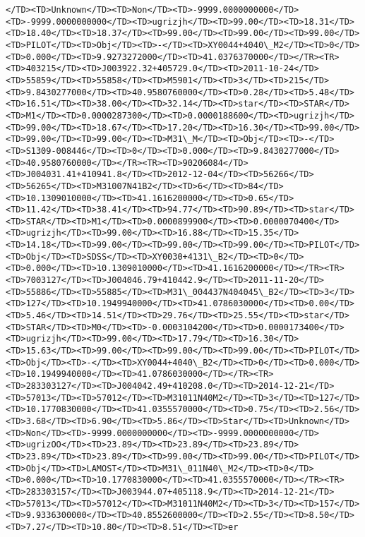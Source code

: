\documentclass[11pt]{article}
\begin{document}
\begin{Verbatim}[commandchars=\\\{\}]
</TD><TD>Unknown</TD><TD>Non</TD><TD>-9999.0000000000</TD><TD>-9999.0000000000</TD><TD>ugrizjh</TD><TD>99.00</TD><TD>18.31</TD><TD>18.40</TD><TD>18.37</TD><TD>99.00</TD><TD>99.00</TD><TD>99.00</TD><TD>PILOT</TD><TD>Obj</TD><TD>-</TD><TD>XY0044+4040\_M2</TD><TD>0</TD><TD>0.000</TD><TD>9.9273272000</TD><TD>41.0376370000</TD></TR><TR><TD>403215</TD><TD>J003922.32+405729.0</TD><TD>2011-10-24</TD><TD>55859</TD><TD>55858</TD><TD>M5901</TD><TD>3</TD><TD>215</TD><TD>9.8430277000</TD><TD>40.9580760000</TD><TD>0.28</TD><TD>5.48</TD><TD>16.51</TD><TD>38.00</TD><TD>32.14</TD><TD>star</TD><TD>STAR</TD><TD>M1</TD><TD>0.0000287300</TD><TD>0.0000188600</TD><TD>ugrizjh</TD><TD>99.00</TD><TD>18.67</TD><TD>17.20</TD><TD>16.30</TD><TD>99.00</TD><TD>99.00</TD><TD>99.00</TD><TD>M31\_M</TD><TD>Obj</TD><TD>-</TD><TD>S1309-008446</TD><TD>0</TD><TD>0.000</TD><TD>9.8430277000</TD><TD>40.9580760000</TD></TR><TR><TD>90206084</TD><TD>J004031.41+410941.8</TD><TD>2012-12-04</TD><TD>56266</TD><TD>56265</TD><TD>M31007N41B2</TD><TD>6</TD><TD>84</TD><TD>10.1309010000</TD><TD>41.1616200000</TD><TD>0.65</TD><TD>11.42</TD><TD>38.41</TD><TD>94.77</TD><TD>90.89</TD><TD>star</TD><TD>STAR</TD><TD>M1</TD><TD>0.0000899900</TD><TD>0.0000070400</TD><TD>ugrizjh</TD><TD>99.00</TD><TD>16.88</TD><TD>15.35</TD><TD>14.18</TD><TD>99.00</TD><TD>99.00</TD><TD>99.00</TD><TD>PILOT</TD><TD>Obj</TD><TD>SDSS</TD><TD>XY0030+4131\_B2</TD><TD>0</TD><TD>0.000</TD><TD>10.1309010000</TD><TD>41.1616200000</TD></TR><TR><TD>7003127</TD><TD>J004046.79+410442.9</TD><TD>2011-11-20</TD><TD>55886</TD><TD>55885</TD><TD>M31\_004437N404045\_B2</TD><TD>3</TD><TD>127</TD><TD>10.1949940000</TD><TD>41.0786030000</TD><TD>0.00</TD><TD>5.46</TD><TD>14.51</TD><TD>29.76</TD><TD>25.55</TD><TD>star</TD><TD>STAR</TD><TD>M0</TD><TD>-0.0003104200</TD><TD>0.0000173400</TD><TD>ugrizjh</TD><TD>99.00</TD><TD>17.79</TD><TD>16.30</TD><TD>15.63</TD><TD>99.00</TD><TD>99.00</TD><TD>99.00</TD><TD>PILOT</TD><TD>Obj</TD><TD>-</TD><TD>XY0044+4040\_B2</TD><TD>0</TD><TD>0.000</TD><TD>10.1949940000</TD><TD>41.0786030000</TD></TR><TR><TD>283303127</TD><TD>J004042.49+410208.0</TD><TD>2014-12-21</TD><TD>57013</TD><TD>57012</TD><TD>M31011N40M2</TD><TD>3</TD><TD>127</TD><TD>10.1770830000</TD><TD>41.0355570000</TD><TD>0.75</TD><TD>2.56</TD><TD>3.68</TD><TD>6.90</TD><TD>5.86</TD><TD>Star</TD><TD>Unknown</TD><TD>Non</TD><TD>-9999.0000000000</TD><TD>-9999.0000000000</TD><TD>ugrizOO</TD><TD>23.89</TD><TD>23.89</TD><TD>23.89</TD><TD>23.89</TD><TD>23.89</TD><TD>99.00</TD><TD>99.00</TD><TD>PILOT</TD><TD>Obj</TD><TD>LAMOST</TD><TD>M31\_011N40\_M2</TD><TD>0</TD><TD>0.000</TD><TD>10.1770830000</TD><TD>41.0355570000</TD></TR><TR><TD>283303157</TD><TD>J003944.07+405118.9</TD><TD>2014-12-21</TD><TD>57013</TD><TD>57012</TD><TD>M31011N40M2</TD><TD>3</TD><TD>157</TD><TD>9.9336300000</TD><TD>40.8552600000</TD><TD>2.55</TD><TD>8.50</TD><TD>7.27</TD><TD>10.80</TD><TD>8.51</TD><TD>er  
\end{Verbatim}
\end{document}
